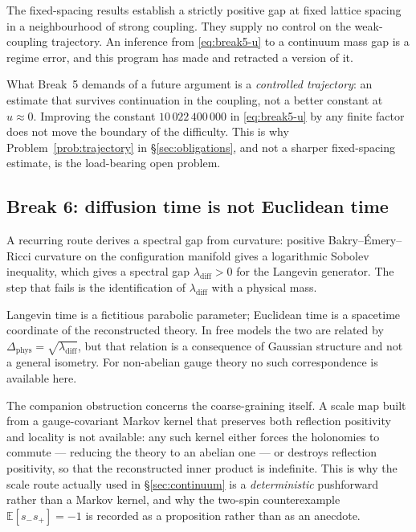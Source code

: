 \begin{scopenote}
The fixed-spacing results establish a strictly positive gap at fixed
lattice spacing in a neighbourhood of strong coupling. They supply no
control on the weak-coupling trajectory. An inference from
\eqref{eq:break5-u} to a continuum mass gap is a regime error, and this
program has made and retracted a version of it.
\end{scopenote}

What Break~5 demands of a future argument is a \emph{controlled
trajectory}: an estimate that survives continuation in the coupling, not
a better constant at $u \approx 0$. Improving the constant
$10\,022\,400\,000$ in \eqref{eq:break5-u} by any finite factor does not
move the boundary of the difficulty. This is why Problem~\ref{prob:trajectory}
in \S\ref{sec:obligations}, and not a sharper fixed-spacing estimate, is
the load-bearing open problem.

\subsection{Break 6: diffusion time is not Euclidean time}
\label{sec:break6}

A recurring route derives a spectral gap from curvature: positive
Bakry--\'Emery--Ricci curvature on the configuration manifold gives a
logarithmic Sobolev inequality, which gives a spectral gap
$\lambda_{\mathrm{diff}} > 0$ for the Langevin generator. The step that
fails is the identification of $\lambda_{\mathrm{diff}}$ with a physical
mass.

Langevin time is a fictitious parabolic parameter; Euclidean time is a
spacetime coordinate of the reconstructed theory. In free models the two
are related by $\Delta_{\mathrm{phys}} = \sqrt{\lambda_{\mathrm{diff}}}$,
but that relation is a consequence of Gaussian structure and not a
general isometry. For non-abelian gauge theory no such correspondence is
available here.

The companion obstruction concerns the coarse-graining itself. A scale
map built from a gauge-covariant Markov kernel that preserves both
reflection positivity and locality is not available: any such kernel
either forces the holonomies to commute --- reducing the theory to an
abelian one --- or destroys reflection positivity, so that the
reconstructed inner product is indefinite. This is why the scale route
actually used in \S\ref{sec:continuum} is a \emph{deterministic}
pushforward rather than a Markov kernel, and why the two-spin
counterexample $\mathbb{E}[s_- s_+] = -1$ is recorded as a proposition
rather than as an anecdote.

